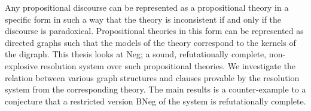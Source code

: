 Any propositional discourse can be represented as a propositional theory in a specific form in such a way that the theory is inconsistent if and only if the discourse is paradoxical.
Propositional theories in this form can be represented as directed graphs such that the models of the theory correspond to the kernels of the digraph.
This thesis looks at Neg; a sound, refutationally complete, non-explosive resolution system over such propositional theories.
We investigate the relation between various graph structures and clauses provable by the resolution system from the corresponding theory.
The main results is a counter-example to a conjecture that a restricted version BNeg of the system is refutationally complete.
